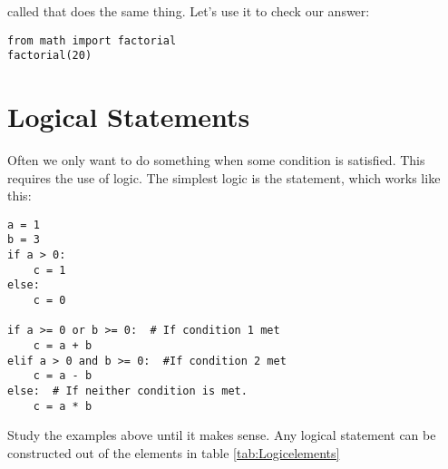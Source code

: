called  that does the same thing.  Let's use it to
check our answer:

\begin{Verbatim}
from math import factorial
factorial(20)
\end{Verbatim}

\section{Logical Statements}
Often we only want to do something when some condition is satisfied.
This requires the use of logic.  The simplest logic is the
 statement, which works like this:
\begin{Verbatim}
a = 1
b = 3
if a > 0:
    c = 1
else:
    c = 0

if a >= 0 or b >= 0:  # If condition 1 met
    c = a + b
elif a > 0 and b >= 0:  #If condition 2 met
    c = a - b
else:  # If neither condition is met.
    c = a * b
\end{Verbatim}
Study the examples above until it makes sense.  Any logical statement
can be constructed out of the elements in table
\ref{tab:Logicelements}

